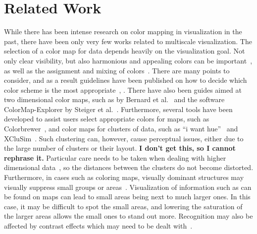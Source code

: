 \documentclass{egpubl}
\begin{document}
	\section{Related Work}
	While there has been intense research on color mapping in visualization in the past, there have been only very few works related to multiscale visualization.
%		
	The selection of a color map for data depends heavily on the visualization goal. 
	Not only clear visibility, but also harmonious and appealing colors can be important~\cite{ihaka2003colour}, as well as the assignment and mixing of colors~\cite{wang2008color}. 
	There are many points to consider, and as a result guidelines have been published on how to decide which color scheme is the most appropriate~\cite{bergman1995rule}, \cite{healey1996choosing}. There have also been guides aimed at two dimensional color maps, such as by Bernard et al.~\cite{bernard2015survey} and the software ColorMap-Explorer by Steiger et al.~\cite{steiger2015explorative}.	
	Furthermore, several tools have been developed to assist users select appropriate colors for maps, such as Colorbrewer~\cite{harrower2003colorbrewer}, and color maps for clusters of data, such as ``i want hue''~\cite{iwanthue} and XCluSim~\cite{l2015xclusim}. 	
	Such clustering can, however, cause perceptual issues, either due to the large number of clusters or their layout. \textbf{I don't get this, so I cannot rephrase it.} 
	Particular care needs to be taken when dealing with higher dimensional data~\cite{mittelstiidt2014revisiting}, so the distances between the clusters do not become distorted. 
	Furthermore, in cases such as coloring maps, visually dominant structures may visually suppress small groups or areas~\cite{lee2013perceptually}.
	Visualization of information such as can be found on maps can lead to small areas being next to much larger ones. 
	In this case, it may be difficult to spot the small areas, and lowering the saturation of the larger areas allows the small ones to stand out more.
	Recognition may also be affected by contrast effects which may need to be dealt with~\cite{mittelstadt2014methods}. 
	
\end{document}
